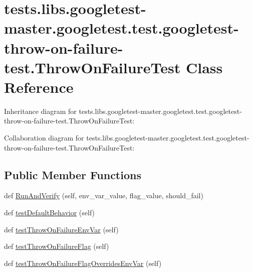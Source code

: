 \hypertarget{classtests_1_1libs_1_1googletest-master_1_1googletest_1_1test_1_1googletest-throw-on-failure-test_1_1ThrowOnFailureTest}{}\section{tests.\+libs.\+googletest-\/master.googletest.\+test.\+googletest-\/throw-\/on-\/failure-\/test.Throw\+On\+Failure\+Test Class Reference}
\label{classtests_1_1libs_1_1googletest-master_1_1googletest_1_1test_1_1googletest-throw-on-failure-test_1_1ThrowOnFailureTest}


Inheritance diagram for tests.\+libs.\+googletest-\/master.googletest.\+test.\+googletest-\/throw-\/on-\/failure-\/test.Throw\+On\+Failure\+Test\+:


Collaboration diagram for tests.\+libs.\+googletest-\/master.googletest.\+test.\+googletest-\/throw-\/on-\/failure-\/test.Throw\+On\+Failure\+Test\+:
\subsection*{Public Member Functions}
\begin{DoxyCompactItemize}
\item 
def \hyperlink{classtests_1_1libs_1_1googletest-master_1_1googletest_1_1test_1_1googletest-throw-on-failure-test_1_1ThrowOnFailureTest_a4fe2fefebbfce3c37674e8474d8091ff}{Run\+And\+Verify} (self, env\+\_\+var\+\_\+value, flag\+\_\+value, should\+\_\+fail)
\item 
def \hyperlink{classtests_1_1libs_1_1googletest-master_1_1googletest_1_1test_1_1googletest-throw-on-failure-test_1_1ThrowOnFailureTest_ab44406e09e8eb2614d38f22702bd406b}{test\+Default\+Behavior} (self)
\item 
def \hyperlink{classtests_1_1libs_1_1googletest-master_1_1googletest_1_1test_1_1googletest-throw-on-failure-test_1_1ThrowOnFailureTest_a6ed726f1778918bfde81da9df31576be}{test\+Throw\+On\+Failure\+Env\+Var} (self)
\item 
def \hyperlink{classtests_1_1libs_1_1googletest-master_1_1googletest_1_1test_1_1googletest-throw-on-failure-test_1_1ThrowOnFailureTest_a743ffc030cea96ffd22e3767e3b75aa1}{test\+Throw\+On\+Failure\+Flag} (self)
\item 
def \hyperlink{classtests_1_1libs_1_1googletest-master_1_1googletest_1_1test_1_1googletest-throw-on-failure-test_1_1ThrowOnFailureTest_ae721b5b8cd7d122b7a8f0d18ff72f188}{test\+Throw\+On\+Failure\+Flag\+Overrides\+Env\+Var} (self)
\end{DoxyCompactItemize}


